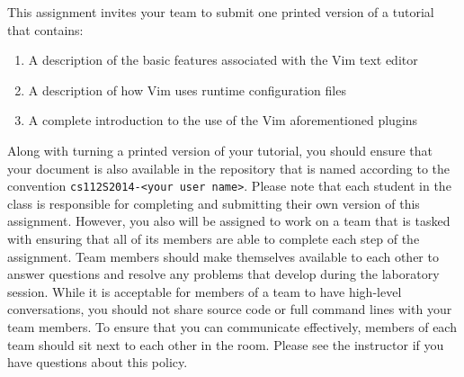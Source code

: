 This assignment invites your team to submit one printed version of a tutorial that contains:

\begin{enumerate}
	
	\item A description of the basic features associated with the Vim text editor

	\item A description of how Vim uses runtime configuration files

	\item A complete introduction to the use of the Vim aforementioned plugins 

\end{enumerate}

Along with turning a printed version of your tutorial, you should ensure that your document is also available in the repository
that is named according to the convention {\tt cs112S2014-<your user name>}. Please note that each student in the class is
responsible for completing and submitting their own version of this assignment.  However, you also will be assigned to work on a
team that is tasked with ensuring that all of its members are able to complete each step of the assignment.  Team members should
make themselves available to each other to answer questions and resolve any problems that develop during the laboratory session.
While it is acceptable for members of a team to have high-level conversations, you should not share source code or full command
lines with your team members. To ensure that you can communicate effectively, members of each team should sit next to each other
in the room.  Please see the instructor if you have questions about this policy.


